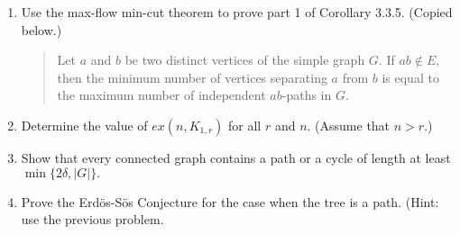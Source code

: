 \documentclass[12pt]{article}
\begin{document}
\begin{enumerate}
\item Use the max-flow min-cut theorem to prove part 1 of Corollary 3.3.5. (Copied below.)\\

\begin{quote}
Let $a$ and $b$ be two distinct vertices of the simple graph $G$. If $ab \not \in E,$ then the minimum number of vertices separating $a$ from $b$ is equal to the maximum number of independent $ab$-paths in $G.$
\end{quote}

\item Determine the value of $ex(n,K_{1,r})$ for all $r$ and $n$. (Assume that $n>r.$)
\item Show that every connected graph contains a path or a cycle of length at least $\min\{2\delta, |G|\}.$
\item Prove the Erd\"{o}s-S\"os Conjecture for the case when the tree is a path. (Hint: use the previous problem.
\end{enumerate}
\end{document}
